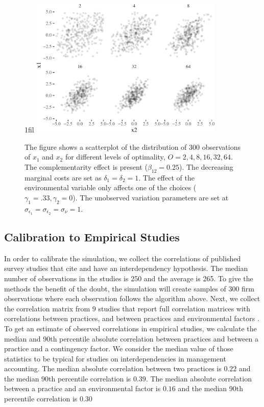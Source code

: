 \documentclass[12pt]{article}
\makeatletter
\newcommand*{\centerfloat}{%
  \parindent \z@
  \leftskip \z@ \@plus 1fil \@minus \textwidth
  \rightskip\leftskip
  \parfillskip \z@skip}
\makeatother
\begin{document}
\begin{figure}
\centerfloat
\includegraphics[width=350px]{figure-latex/scatter-1.pdf}
\caption[Scatterplot of simulated practices]{\label{scatter} The figure shows a scatterplot of the distribution of $300$ observations of $x_1$ and $x_2$ for different levels of optimality, $O = 2, 4, 8, 16, 32, 64$. The complementarity effect is present ($\beta_{12} = 0.25$). The decreasing marginal costs are set as $\delta_1 = \delta_2 = 1$. The effect of the environmental variable only affects one of the choices
($\gamma_1 = .33, \gamma_2 = 0$). The unobserved variation parameters are set at $\sigma_{\epsilon_1} = \sigma_{\epsilon_2} = \sigma_{\nu} = 1.$} 
\end{figure}

\subsection{Calibration to Empirical Studies}\label{calibration-to-empirical-studies}

In order to calibrate the simulation, we collect the correlations of published survey studies that cite \citet{grabner_management_2013} and have an interdependency hypothesis. The median number of observations in the studies is 250 and the average is 265. To give the methods the benefit of the doubt, the simulation will create samples of 300 firm observations where each observation follows the algorithm above. Next, we collect the correlation matrix from 9 studies that report full correlation matrices with correlations between practices, and between practices and environmental factors \citep{dekker_collaborative_2016, grabner_incentive_2014, grabner_cost_2016, bedford_configurations_2015, heinicke_examination_2016, bedford_performance_2019, abernethy_are_2015, sponem_exploring_2016, samagaio_management_2018}. To get an estimate of observed correlations in empirical studies, we calculate the median and 90th percentile absolute correlation between practices and between a practice and a contingency factor. We consider the median value of those statistics to be typical for studies on interdependencies in management accounting. The median absolute correlation between two practices is $0.22$ and the median 90th percentile correlation is $0.39$. The median absolute correlation between a practice and an environmental factor is $0.16$ and the median 90th percentile correlation is $0.30$
\end{document}
